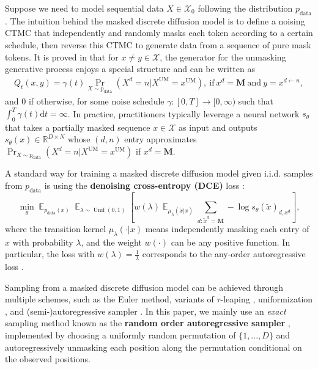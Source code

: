 \documentclass{article}
\theoremstyle{remark}
\newcommand{\sq}[1]{\left[#1\right]} %
\newcommand{\E}{\operatorname{\mathbb{E}}}
\newcommand{\R}{\mathbb{R}}
\newcommand{\unif}{\operatorname{Unif}}
\renewcommand{\d}{\mathrm{d}}
\newcommand{\cX}{\mathcal{X}}
\newcommand{\xt}{\widetilde{x}}
\newcommand{\pdata}{p_\mathrm{data}}
\newcommand{\um}{\mathrm{UM}} %
\newcommand{\mask}{\mathbf{M}}
\begin{document}
Suppose we need to model sequential data $X \in \cX_0$ following the distribution $\pdata$. The intuition behind the masked discrete diffusion model is to define a noising CTMC that independently and randomly masks each token according to a certain schedule, then reverse this CTMC to generate data from a sequence of pure mask tokens. It is proved in \cite{ou2025your} that for $x\ne y\in\cX$, the generator for the unmasking generative process enjoys a special structure and can be written as
%
%
%
%
%
%
%
\begin{align}
Q_t(x,y)= \gamma(t)\Pr_{X\sim\pdata}(X^d=n|X^\um=x^\um), ~\text{if}~x^d=\mask~\text{and}~y=x^{d\gets n},
\label{eq:gen_pre}
\end{align}
and $0$ if otherwise, for some noise schedule $\gamma:[0,T]\to[0,\infty)$ such that $\int_0^T\gamma(t)\d t=\infty$. In practice, practitioners typically leverage a neural network $s_\theta$ that takes a partially masked sequence $x\in\cX$ as input and outputs $s_\theta(x)\in\R^{D\times N}$ whose $(d,n)$ entry approximates $\Pr_{X\sim\pdata}(X^d=n|X^\um=x^\um)$ if $x^d=\mask$. %

%
%
%

A standard way for training a masked discrete diffusion model given i.i.d. samples from $\pdata$ is using the \textbf{denoising cross-entropy (DCE)} loss \cite{ou2025your, sahoo2024simple, shi2024simplified}:
\begin{equation}
\min_\theta\E_{\pdata(x)}\E_{\lambda\sim\unif(0,1)}\sq{w(\lambda)\E_{\mu_\lambda(\xt|x)}\sum_{d:\xt^d=\mask}-\log s_\theta(\xt)_{d,x^d}},
    \label{eq:loss_dce}
\end{equation}
where the transition kernel $\mu_\lambda(\cdot|x)$ means independently masking each entry of $x$ with probability $\lambda$, and the weight $w(\cdot)$ can be any positive function. In particular, the loss with $w(\lambda)=\frac{1}{\lambda}$ corresponds to the any-order autoregressive loss \cite[Eq. (3.7)]{ou2025your}.

Sampling from a masked discrete diffusion model can be achieved through multiple schemes, such as the Euler method, variants of $\tau$-leaping \cite{lou2024discrete,ou2025your,ren2025fast, campbell2022continuous}, uniformization \cite{chen2025convergence}, and (semi-)autoregressive sampler \cite{arriola2025block, nie2025large}. In this paper, we mainly use an \textit{exact} sampling method known as the \textbf{random order autoregressive sampler} \cite[App. J.4]{ou2025your}, implemented by choosing a uniformly random permutation of $\{1,...,D\}$ and autoregressively unmasking each position along the permutation conditional on the observed positions.
\end{document}
